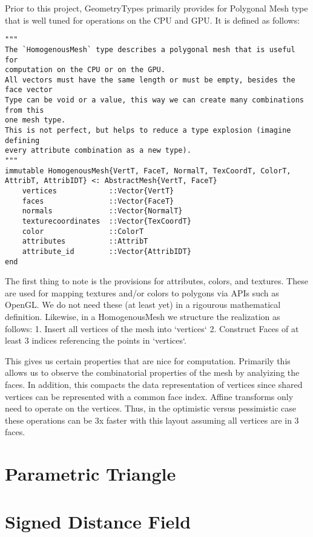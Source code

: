 Prior to this project, GeometryTypes primarily provides for Polygonal Mesh
type that is well tuned for operations on the CPU and GPU. It is defined
as follows:

\begin{lstlisting}
"""
The `HomogenousMesh` type describes a polygonal mesh that is useful for
computation on the CPU or on the GPU.
All vectors must have the same length or must be empty, besides the face vector
Type can be void or a value, this way we can create many combinations from this
one mesh type.
This is not perfect, but helps to reduce a type explosion (imagine defining
every attribute combination as a new type).
"""
immutable HomogenousMesh{VertT, FaceT, NormalT, TexCoordT, ColorT, AttribT, AttribIDT} <: AbstractMesh{VertT, FaceT}
    vertices            ::Vector{VertT}
    faces               ::Vector{FaceT}
    normals             ::Vector{NormalT}
    texturecoordinates  ::Vector{TexCoordT}
    color               ::ColorT
    attributes          ::AttribT
    attribute_id        ::Vector{AttribIDT}
end
\end{lstlisting}

The first thing to note is the provisions for attributes, colors, and textures.
These are used for mapping textures and/or colors to polygons via APIs such as
OpenGL. We do not need these (at least yet) in a rigourous mathematical
definition. Likewise, in a HomogenousMesh we structure the realization as
follows: 1. Insert all vertices of the mesh into `vertices` 2. Construct
Faces of at least 3 indices referencing the points in `vertices`.

This gives us certain properties that are nice for computation. Primarily
this allows us to observe the combinatorial properties of the mesh by analyizing
the faces. In addition, this compacts the data representation of vertices
since shared vertices can be represented with a common face index. Affine
transforms only need to operate on the vertices. Thus, in the optimistic versus
pessimistic case these operations can be 3x faster with this layout
assuming all vertices are in 3 faces.



\section{Parametric Triangle}




\section{Signed Distance Field}


